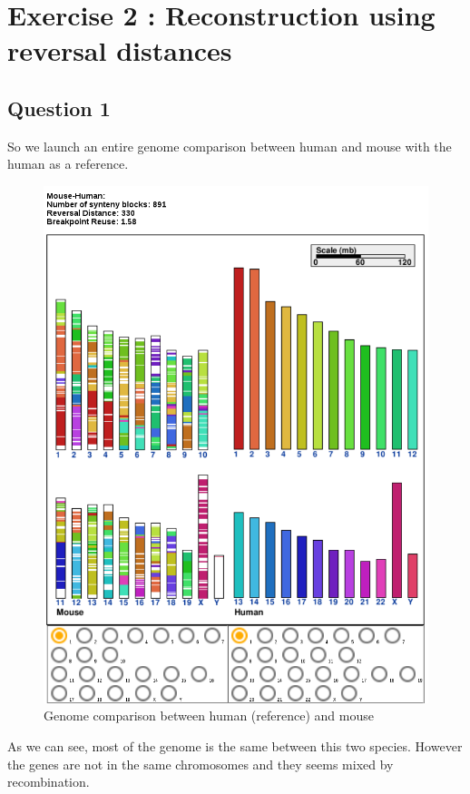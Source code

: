 \documentclass[]{article}
\theoremstyle{definition}
\begin{document}
\newpage 
\section{Exercise 2 : Reconstruction using reversal distances}
\subsection{Question 1}
So we launch an entire genome comparison between human and mouse with the human as a reference.


\begin{figure}[h!]
	\centering
	\includegraphics*[height = 0.7\textheight]{../human_mouse.png}
	\caption{\label{h_m} Genome comparison between human (reference) and mouse }
\end{figure}

As we can see, most of the genome is the same between this two species. However the genes are not in the same chromosomes and they seems mixed by recombination.
\end{document}
